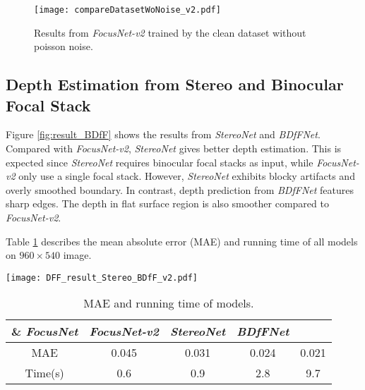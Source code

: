 \documentclass[10pt,twocolumn,letterpaper]{article}
\begin{document}
\begin{figure}[t]
\begin{center}
   \texttt{[image: compareDatasetWoNoise\_v2.pdf]}
\end{center}
\vspace{-8pt}
   \caption{Results from \emph{FocusNet-v2} trained by the clean dataset without poisson noise.}
\label{fig:result_datasetWoNoise}
\end{figure}

\subsection{Depth Estimation from Stereo and Binocular Focal Stack}
\label{section:stereoAndBDfF}

Figure \ref{fig:result_BDfF} shows the results from \emph{StereoNet} and \emph{BDfFNet}. Compared with \emph{FocusNet-v2}, \emph{StereoNet} gives better depth estimation. This is expected since \emph{StereoNet} requires binocular focal stacks as input, while \emph{FocusNet-v2} only use a single focal stack. However, \emph{StereoNet} exhibits blocky artifacts and overly smoothed boundary. In contrast, depth prediction from \emph{BDfFNet} features sharp edges. The depth in flat surface region is also smoother compared to \emph{FocusNet-v2}.

Table \ref{tab:result} describes the mean absolute error (MAE) and running time of all models on $960\times540$ image.

\begin{figure*}[t]
\begin{center}
   \texttt{[image: DFF\_result\_Stereo\_BDfF\_v2.pdf]}
\end{center}
\vspace{-8pt}
   \caption{Comparisons on results only using \emph{StereoNet} vs. the composed \emph{BDfFNet}. BDfFNet produces much sharper boundaries while reducing blocky artifacts.}
\label{fig:result_BDfF}
\end{figure*}

\begin{table}[b]
\begin{center}
 \begin{tabular}{|c|c |c |c |c|}

    \hline
    \& \emph{FocusNet}   & \emph{FocusNet-v2} & \emph{StereoNet} & \emph{BDfFNet} \\ [0.5ex]
    \hline
    MAE & 0.045  & 0.031 & 0.024 & 0.021 \\
    Time(s) & 0.6  & 0.9 & 2.8 & 9.7 \\

 \hline

\end{tabular}
\caption{MAE and running time of models.}
\label{tab:result}
\end{center}
\end{table}
\end{document}
